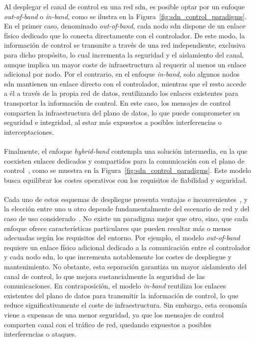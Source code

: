 Al desplegar el canal de control en una red \gls{sdn}, es posible optar por un enfoque \textit{out-of-band} o \textit{in-band}, como se ilustra en la Figura~\ref{fig:sdn_control_paradigms}. En el primer caso, denominado \textit{out-of-band}, cada nodo \gls{sdn} dispone de un enlace físico dedicado que lo conecta directamente con el controlador. De este modo, la información de control se transmite a través de una red independiente, exclusiva para dicho propósito, lo cual incrementa la seguridad y el aislamiento del canal, aunque implica un mayor coste de infraestructura al requerir al menos un enlace adicional por nodo. Por el contrario, en el enfoque \textit{in-band}, solo algunos nodos \gls{sdn} mantienen un enlace directo con el controlador, mientras que el resto accede a él a través de la propia red de datos, reutilizando los enlaces existentes para transportar la información de control. En este caso, los mensajes de control comparten la infraestructura del plano de datos, lo que puede comprometer su seguridad e integridad, al estar más expuestos a posibles interferencias o interceptaciones. \\
\\
Finalmente, el enfoque \textit{hybrid-band} contempla una solución intermedia, en la que coexisten enlaces dedicados y compartidos para la comunicación con el plano de control~\cite{Suo16}, como se muestra en la Figura~\ref{fig:sdn_control_paradigms}. Este modelo busca equilibrar los costes operativos con los requisitos de fiabilidad y seguridad.\\
\\
Cada uno de estos esquemas de despliegue presenta ventajas e inconvenientes~\cite{Suo16}, y la elección entre uno u otro depende fundamentalmente del escenario de red y del caso de uso considerado~\cite{Jalili17,Kafetzis22}. No existe un paradigma mejor que otro, sino, que cada enfoque ofrece características particulares que pueden resultar más o menos adecuadas según los requisitos del entorno. Por ejemplo, el modelo \textit{out-of-band} requiere un enlace físico adicional dedicado a la comunicación entre el controlador y cada nodo \gls{sdn}, lo que incrementa notablemente los costes de despliegue y mantenimiento. No obstante, esta separación garantiza un mayor aislamiento del canal de control, lo que mejora sustancialmente la seguridad de las comunicaciones. En contraposición, el modelo \textit{in-band} reutiliza los enlaces existentes del plano de datos para transmitir la información de control, lo que reduce significativamente el coste de infraestructura. Sin embargo, esta economía viene a expensas de una menor seguridad, ya que los mensajes de control comparten canal con el tráfico de red, quedando expuestos a posibles interferencias o ataques. \\
